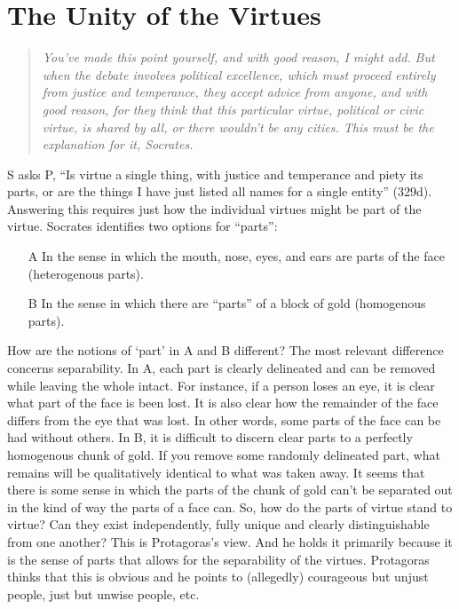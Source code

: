 \documentclass[oneside]{article}
\begin{document}
\vspace*{2mm}



\section*{The Unity of the Virtues}
\begin{quote} \emph{You've made this point yourself, and with good reason, I might add. But when the debate involves political excellence, which must proceed entirely from justice and temperance, they accept advice from anyone, and with good reason, for they think that this particular virtue, political or civic virtue, is shared by all, or there wouldn't be any cities. This must be the explanation for it, Socrates.}
\end{quote}




\noindent S asks P, ``Is virtue a single thing, with justice and temperance and piety its parts, or are the things I have just listed all names for a single entity'' (329d). Answering this requires just how the individual virtues might be part of the virtue. Socrates identifies two options for ``parts'':
\begin{itemize}
\item[A] In the sense in which the mouth, nose, eyes, and ears are parts of the face (heterogenous parts). 

\item[B] In the sense in which there are ``parts'' of a block of gold (homogenous parts).
\end{itemize}
\vspace*{2mm}
How are the notions of `part' in A and B different? The most relevant difference concerns separability. In A, each part is clearly delineated and can be removed while leaving the whole intact. For instance, if a person loses an eye, it is clear what part of the face is been lost. It is also clear how the remainder of the face differs from the eye that was lost. In other words, some parts of the face can be had without others. In B, it is difficult to discern clear parts to a perfectly homogenous chunk of gold. If you remove some randomly delineated part, what remains will be qualitatively identical to what was taken away. It seems that there is some sense in which the parts of the chunk of gold can't be separated out in the kind of way the parts of a face can. So, how do the parts of virtue stand to virtue? Can they exist independently, fully unique and clearly distinguishable from one another? This is Protagoras's view. And he holds it primarily because it is the sense of parts that allows for the separability of the virtues. Protagoras thinks that this is obvious and he points to (allegedly) courageous but unjust people, just but unwise people, etc. 
\end{document}
